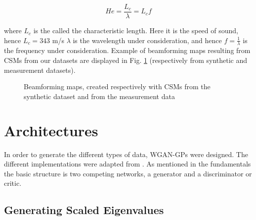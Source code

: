 \documentclass[11pt,a4paper,twoside]{report}
\begin{document}
\begin{equation}
    He = \frac{L_c}{\lambda} = L_c f 
\end{equation}

where $L_c$ is the called the characteristic length. Here it is the speed of sound, hence $L_c = 343$ m/s $\lambda$ is the wavelength under consideration, and hence $f = \frac{1}{\lambda}$ is the frequency under consideration. Example of beamforming maps resulting from CSMs from our datasets are displayed in Fig. \ref{fig:datasets_beamforming_example} (respectively from synthetic and measurement datasets).

\begin{figure}
    \centering
    \caption{Beamforming maps, created respectively with CSMs from the synthetic dataset and from the measurement data}
    \label{fig:datasets_beamforming_example}    
\end{figure}

\section{Architectures}

In order to generate the different types of data, WGAN-GPs were designed. The different implementations were adapted from \cite{nain2020wgangp}. As mentioned in the fundamentals the basic structure is two competing networks, a generator and a discriminator or critic.

\subsection{Generating Scaled Eigenvalues}
\end{document}
